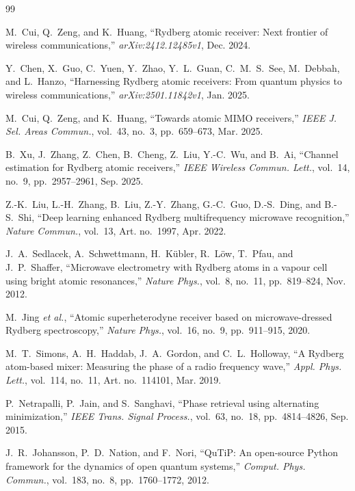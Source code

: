\documentclass[11pt,a4paper]{article}
\begin{document}
\newpage
\begin{thebibliography}{99}

M.~Cui, Q.~Zeng, and K.~Huang, ``Rydberg atomic receiver: Next frontier of wireless
communications,'' \textit{arXiv:2412.12485v1}, Dec. 2024.

Y.~Chen, X.~Guo, C.~Yuen, Y.~Zhao, Y.~L.~Guan, C.~M.~S.~See, M.~Debbah, and L.~Hanzo,
``Harnessing Rydberg atomic receivers: From quantum physics to wireless communications,''
\textit{arXiv:2501.11842v1}, Jan. 2025.

M.~Cui, Q.~Zeng, and K.~Huang, ``Towards atomic MIMO receivers,'' \textit{IEEE J. Sel.
Areas Commun.}, vol.~43, no.~3, pp.~659--673, Mar. 2025.

B.~Xu, J.~Zhang, Z.~Chen, B.~Cheng, Z.~Liu, Y.-C.~Wu, and B.~Ai, ``Channel estimation for
Rydberg atomic receivers,'' \textit{IEEE Wireless Commun. Lett.}, vol.~14, no.~9,
pp.~2957--2961, Sep. 2025.

Z.-K.~Liu, L.-H.~Zhang, B.~Liu, Z.-Y.~Zhang, G.-C.~Guo, D.-S.~Ding, and B.-S.~Shi, ``Deep
learning enhanced Rydberg multifrequency microwave recognition,'' \textit{Nature Commun.},
vol.~13, Art. no.~1997, Apr. 2022.

J.~A.~Sedlacek, A.~Schwettmann, H.~K\"ubler, R.~L\"ow, T.~Pfau, and J.~P.~Shaffer,
``Microwave electrometry with Rydberg atoms in a vapour cell using bright atomic
resonances,'' \textit{Nature Phys.}, vol.~8, no.~11, pp.~819--824, Nov. 2012.

M.~Jing \textit{et al.}, ``Atomic superheterodyne receiver based on microwave-dressed
Rydberg spectroscopy,'' \textit{Nature Phys.}, vol.~16, no.~9, pp.~911--915, 2020.

M.~T.~Simons, A.~H.~Haddab, J.~A.~Gordon, and C.~L.~Holloway, ``A Rydberg atom-based
mixer: Measuring the phase of a radio frequency wave,'' \textit{Appl. Phys. Lett.},
vol.~114, no.~11, Art. no.~114101, Mar. 2019.

P.~Netrapalli, P.~Jain, and S.~Sanghavi, ``Phase retrieval using alternating
minimization,'' \textit{IEEE Trans. Signal Process.}, vol.~63, no.~18, pp.~4814--4826,
Sep. 2015.

J.~R.~Johansson, P.~D.~Nation, and F.~Nori, ``QuTiP: An open-source Python framework for the
dynamics of open quantum systems,'' \textit{Comput. Phys. Commun.}, vol.~183, no.~8,
pp.~1760--1772, 2012.

\end{thebibliography}
\end{document}
